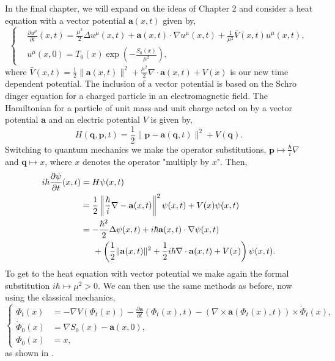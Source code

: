 \documentclass[a4paper,12pt,draft]{report}
\begin{document}
In the final chapter, we will expand on the ideas of Chapter 2 and consider a heat equation with a vector potential $\mathbf{a}(x, t)$ given by,
$$
\left\{
\begin{aligned}
& \frac{\partial u^\mu}{\partial t}(x, t) = \frac{\mu^2}{2}\Delta u^\mu(x, t) + \mathbf{a}(x, t)\cdot\nabla u^\mu(x, t) + \frac{1}{\mu^2}\bar{V}(x, t)u^\mu(x, t),\\
& u^\mu(x, 0) = T_0(x)\exp\left(-\frac{S_0(x)}{\mu^2}\right),
\end{aligned}
\right.
$$
where $\bar{V}(x, t) = \frac{1}{2}\|\mathbf{a}(x, t)\|^2 + \frac{\mu^2}{2}\nabla\cdot\mathbf{a}(x, t) + V(x)$ is our new time dependent potential.  The inclusion of a vector potential is based on the Schr$\ddot{\text{o}}$dinger equation for a charged particle in an electromagnetic field.  The Hamiltonian for a particle of unit mass and unit charge acted on by a vector potential $\mathbf{a}$ and an electric potential $V$ is given by,
$$
H(\mathbf{q}, \mathbf{p}, t) = \frac{1}{2}\|\mathbf{p} - \mathbf{a}(\mathbf{q}, t)\|^2 + V(\mathbf{q}).
$$
Switching to quantum mechanics we make the operator substitutions, $\mathbf{p} \mapsto \frac{\hbar}{i}\nabla$ and $\mathbf{q} \mapsto x$, where $x$ denotes the operator "multiply by $x$".  Then,
\begin{align}
i\hbar\frac{\partial\psi}{\partial t}(x, t) & = H\psi(x, t)\nonumber\\
& = \frac{1}{2}\left\|\frac{\hbar}{i}\nabla - \mathbf{a}(x, t)\right\|^2\psi(x, t) + V(x)\psi(x, t)\nonumber\\
& = -\frac{\hbar^2}{2}\Delta\psi(x, t) + i\hbar\mathbf{a}(x, t)\cdot\nabla\psi(x, t)\nonumber\\
& \hspace{0.5cm} + \left(\frac{1}{2}\|\mathbf{a}(x, t)\|^2 + \frac{1}{2}i\hbar\nabla\cdot\mathbf{a}(x, t) + V(x)\right)\psi(x, t).\nonumber
\end{align}
To get to the heat equation with vector potential we make again the formal substitution $i\hbar \mapsto \mu^2 > 0$.  We can then use the same methods as before, now using the classical mechanics,
$$
\left\{
\begin{aligned}
\ddot{\Phi}_t(x) & = -\nabla V(\Phi_t(x)) - \frac{\partial \mathbf{a}}{\partial t}(\Phi_t(x), t) - (\nabla \times \mathbf{a}(\Phi_t(x), t))\times\dot{\Phi}_t(x),\\
\dot{\Phi}_0(x) & = \nabla S_0(x) - \mathbf{a}(x, 0),\\
\Phi_0(x) & = x,
\end{aligned}
\right.
$$
as shown in \cite{ANSRAT}.
\end{document}
